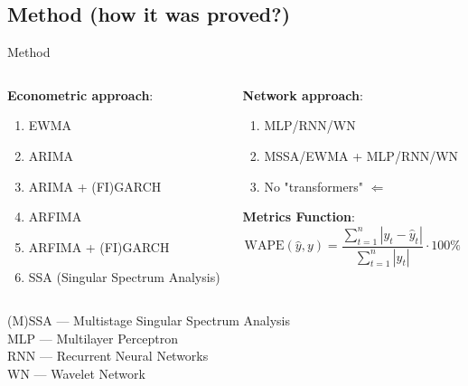 \documentclass[11pt, aspectratio= 169]{beamer}
\begin{document}
	
	\subsection{Method (how it was proved?)}
	\begin{frame}{Method}
		\begin{columns}
			\begin{column}{0.5\textwidth}
				\textbf{Econometric approach}:
				\begin{center}
					\begin{enumerate}
						\item EWMA
						\item ARIMA
						\item ARIMA + (FI)GARCH
						\item ARFIMA
						\item ARFIMA + (FI)GARCH
						\item SSA (Singular Spectrum Analysis)
					\end{enumerate}
				\end{center}
			\end{column}
			\hfill
			\begin{column}{0.5\textwidth}
				\textbf{Network approach}:
				\begin{center}
					\begin{enumerate}
						\item MLP/RNN/WN
						\item MSSA/EWMA + MLP/RNN/WN
						\item No "transformers" $\Leftarrow$ \cite{zeng2022transformers}
					\end{enumerate}
				\end{center}
				\textbf{Metrics Function}:
				\begin{equation}
					\text{WAPE}(\hat{y}, y) = \frac{\sum_{t= 1}^n |y_t - \hat{y}_t|}{\sum_{t= 1}^n |y_t|} \cdot 100\%
				\end{equation}
			\end{column}
		\end{columns}
		\vspace{1cm}
		(M)SSA --- Multistage Singular Spectrum Analysis \cite{kuang2020efficient}\\
		MLP --- Multilayer Perceptron \cite{rosenblatt1961principles}\\
		RNN --- Recurrent Neural Networks \cite{hochreiter1997long}\\
		WN --- Wavelet Network \cite{alexandridis2014wavelet}
	\end{frame}
	
\end{document}
